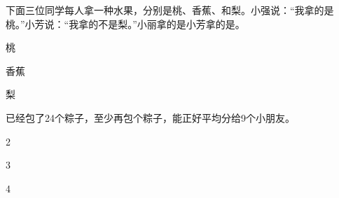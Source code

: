 \documentclass[12pt]{exam-zh}
\begin{document}
\begin{question}[index=2]
下面三位同学每人拿一种水果，分别是桃、香蕉、和梨。小强说：“我拿的是桃。”小芳说：“我拿的不是梨。”小丽拿的是\fillin[width=3em][]小芳拿的是\fillin[width=3em][]。
\begin{choices}
\item 桃
\item 香蕉
\item 梨
\end{choices}
\end{question}

\begin{question}[index=3]
已经包了24个粽子，至少再包\fillin[width=3em][]个粽子，能正好平均分给9个小朋友。
\begin{choices}
\item 2
\item 3
\item 4
\end{choices}
\end{question}
\end{document}
